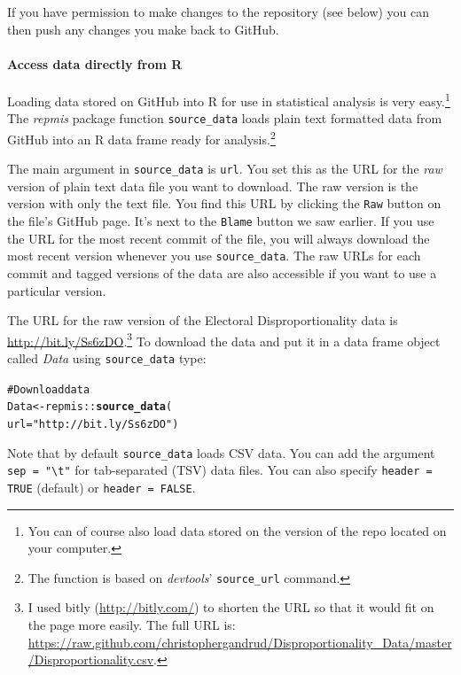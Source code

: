 \documentclass[twocolumn]{article}\usepackage{graphicx, color}
\makeatletter
\newcommand{\hlfunctioncall}[1]{\textcolor[rgb]{0.501960784313725,0,0.329411764705882}{\textbf{#1}}}%
\newcommand{\hlstring}[1]{\textcolor[rgb]{0.6,0.6,1}{#1}}%
\newcommand{\hlcomment}[1]{\textcolor[rgb]{0.180392156862745,0.6,0.341176470588235}{#1}}%
\newenvironment{kframe}{%
 \def\at@end@of@kframe{}%
 \ifinner\ifhmode%
  \def\at@end@of@kframe{\end{minipage}}%
  \begin{minipage}{\columnwidth}%
 \fi\fi%
 \def\FrameCommand##1{\hskip\@totalleftmargin \hskip-\fboxsep
 \colorbox{shadecolor}{##1}\hskip-\fboxsep
     \hskip-\linewidth \hskip-\@totalleftmargin \hskip\columnwidth}%
 \MakeFramed {\advance\hsize-\width
   \@totalleftmargin\z@ \linewidth\hsize
   \@setminipage}}%
 {\par\unskip\endMakeFramed%
 \at@end@of@kframe}
\newenvironment{knitrout}{}{} %
\makeatother
\begin{document}
\noindent If you have permission to make changes to the repository (see below) you can then push any changes you make back to GitHub.

\paragraph{Access data directly from R}

Loading data stored on GitHub into R for use in statistical analysis is very easy.\footnote{You can of course also load data stored on the version of the repo located on your computer.} The \emph{repmis} package \citep{R-repmis} function \verb|source_data| loads plain text formatted data from GitHub into an R data frame ready for analysis.\footnote{The function is based on \emph{devtools}' \texttt{source\_url} command.}

\noindent The main argument in \verb|source_data| is \texttt{url}. You set this as the URL for the \emph{raw} version of plain text data file you want to download. The raw version is the version with only the text file. You find this URL by clicking the \texttt{Raw} button on the file's GitHub page. It's next to the \texttt{Blame} button we saw earlier. If you use the URL for the most recent commit of the file, you will always download the most recent version whenever you use \verb|source_data|. The raw URLs for each commit and tagged versions of the data are also accessible if you want to use a particular version. 

The URL for the raw version of the Electoral Disproportionality data is \url{http://bit.ly/Ss6zDO}.\footnote{I used bitly (\url{http://bitly.com/}) to shorten the URL so that it would fit on the page more easily. The full URL is: \url{https://raw.github.com/christophergandrud/Disproportionality_Data/master/Disproportionality.csv}.}  To download the data and put it in a data frame object called \emph{Data} using \verb|source_data| type:

\begin{knitrout}
\color{fgcolor}\begin{kframe}
\begin{alltt}
\hlcomment{# Download data}
Data <- repmis::\hlfunctioncall{source_data}(
          url = \hlstring{"http://bit.ly/Ss6zDO"})
\end{alltt}
\end{kframe}
\end{knitrout}


\noindent Note that by default \verb|source_data| loads CSV data. You can add the argument \verb|sep = "\t"| for tab-separated (TSV) data files. You can also specify \texttt{header = TRUE} (default) or \texttt{header = FALSE}.
\end{document}
